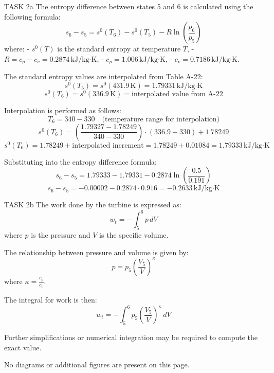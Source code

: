 TASK 2a  
The entropy difference between states 5 and 6 is calculated using the following formula:  
\[
s_6 - s_5 = s^0(T_6) - s^0(T_5) - R \ln\left(\frac{p_6}{p_5}\right)
\]  
where:  
- \( s^0(T) \) is the standard entropy at temperature \( T \),  
- \( R = c_p - c_v = 0.2874 \, \text{kJ/kg·K} \),  
- \( c_p = 1.006 \, \text{kJ/kg·K} \),  
- \( c_v = 0.7186 \, \text{kJ/kg·K} \).  

The standard entropy values are interpolated from Table A-22:  
\[
s^0(T_5) = s^0(431.9 \, \text{K}) = 1.79331 \, \text{kJ/kg·K}
\]  
\[
s^0(T_6) = s^0(336.9 \, \text{K}) = \text{interpolated value from A-22}
\]  

Interpolation is performed as follows:  
\[
T_6 = 340 - 330 \quad \text{(temperature range for interpolation)}
\]  
\[
s^0(T_6) = \left(\frac{1.79327 - 1.78249}{340 - 330}\right) \cdot (336.9 - 330) + 1.78249
\]  
\[
s^0(T_6) = 1.78249 + \text{interpolated increment} = 1.78249 + 0.01084 = 1.79333 \, \text{kJ/kg·K}
\]  

Substituting into the entropy difference formula:  
\[
s_6 - s_5 = 1.79333 - 1.79331 - 0.2874 \ln\left(\frac{0.5}{0.191}\right)
\]  
\[
s_6 - s_5 = -0.00002 - 0.2874 \cdot 0.916 = -0.2633 \, \text{kJ/kg·K}
\]  

TASK 2b  
The work done by the turbine is expressed as:  
\[
w_t = -\int_5^6 p \, dV
\]  
where \( p \) is the pressure and \( V \) is the specific volume.  

The relationship between pressure and volume is given by:  
\[
p = p_5 \left(\frac{V_5}{V}\right)^\kappa
\]  
where \( \kappa = \frac{c_p}{c_v} \).  

The integral for work is then:  
\[
w_t = -\int_5^6 p_5 \left(\frac{V_5}{V}\right)^\kappa \, dV
\]  

Further simplifications or numerical integration may be required to compute the exact value.  

No diagrams or additional figures are present on this page.